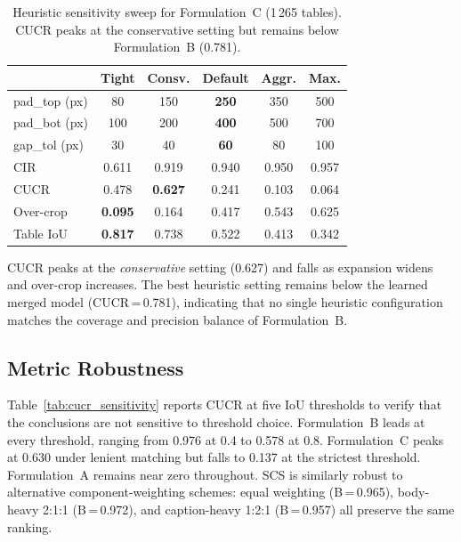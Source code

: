 \documentclass[pdflatex,sn-mathphys-num,iicol]{sn-jnl}
\begin{document}
\begin{table}[ht!]
\caption{Heuristic sensitivity sweep for Formulation~C (1\,265 tables). CUCR peaks at
the conservative setting but remains below Formulation~B (0.781).}
\label{tab:sweep}
\footnotesize\setlength{\tabcolsep}{3pt}
\begin{tabular}{@{}lccccc@{}}
\toprule
& \textbf{Tight} & \textbf{Consv.} & \textbf{Default} & \textbf{Aggr.} & \textbf{Max.} \\
\midrule
pad\_top (px) & 80 & 150 & \textbf{250} & 350 & 500 \\
pad\_bot (px) & 100 & 200 & \textbf{400} & 500 & 700 \\
gap\_tol (px) & 30 & 40 & \textbf{60} & 80 & 100 \\
\midrule
CIR & 0.611 & 0.919 & 0.940 & 0.950 & 0.957 \\
CUCR & 0.478 & \textbf{0.627} & 0.241 & 0.103 & 0.064 \\
Over-crop & \textbf{0.095} & 0.164 & 0.417 & 0.543 & 0.625 \\
Table IoU & \textbf{0.817} & 0.738 & 0.522 & 0.413 & 0.342 \\
\bottomrule
\end{tabular}
\end{table}

CUCR peaks at the \textit{conservative} setting (0.627) and falls as
expansion widens and over-crop increases. The best heuristic setting remains below
the learned merged model (CUCR\,=\,0.781), indicating that no single heuristic
configuration matches the coverage and precision balance of Formulation~B.

\subsection{Metric Robustness}\label{sec:robustness}

Table~\ref{tab:cucr_sensitivity} reports CUCR at five IoU thresholds to verify that
the conclusions are not sensitive to threshold choice. Formulation~B leads at every
threshold, ranging from 0.976 at 0.4 to 0.578 at 0.8. Formulation~C peaks at 0.630
under lenient matching but falls to 0.137 at the strictest threshold.
Formulation~A remains near zero throughout. SCS is similarly robust to alternative
component-weighting schemes: equal weighting (B\,=\,0.965), body-heavy 2:1:1
(B\,=\,0.972), and caption-heavy 1:2:1 (B\,=\,0.957) all preserve the same ranking.
\end{document}
